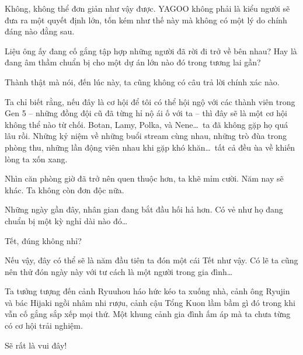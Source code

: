 \documentclass[../main.tex]{subfiles}
\begin{document}
Không, không thể đơn giản như vậy được. YAGOO không phải là kiểu người sẽ đưa ra một quyết định lớn, tốn kém như thế này mà không có một lý do chính đáng nào đằng sau.

Liệu ông ấy đang cố gắng tập hợp những người đã rời đi trở về bên nhau?
Hay là đang âm thầm chuẩn bị cho một dự án lớn nào đó trong tương lai gần?

Thành thật mà nói, đến lúc này, ta cũng không có câu trả lời chính xác nào.

Ta chỉ biết rằng, nếu đây là cơ hội để tôi có thể hội ngộ với các thành viên trong Gen 5 – những đồng đội cũ đã từng hỉ nộ ái ố với ta – thì đây sẽ là một cơ hội không thể nào từ chối. Botan, Lamy, Polka, và Nene\dots\ ta đã không gặp họ quá lâu rồi. Những kỷ niệm về những buổi stream cùng nhau, những trò đùa trong phòng thu, những lần động viên nhau khi gặp khó khăn\dots\ tất cả đều ùa về khiến lòng ta xốn xang.

Nhìn căn phòng giờ đã trở nên quen thuộc hơn, ta khẽ mỉm cười. Năm nay sẽ khác. Ta không còn đơn độc nữa.

Những ngày gần đây, nhân gian đang bắt đầu hối hả hơn. Có vẻ như họ đang chuẩn bị một kỳ nghỉ dài nào đó\dots

Tết, đúng không nhỉ?

Nếu vậy, đây có thể sẽ là năm đầu tiên ta đón một cái Tết như vậy. Có lẽ ta cũng nên thử đón ngày này với tư cách là một người trong gia đình\dots

Ta tưởng tượng đến cảnh Ryuuhou háo hức kéo ta xuống nhà, cảnh ông Ryujin và bác Hijaki ngồi nhâm nhi rượu, cảnh cậu Tổng Kuon lầm bầm gì đó trong khi vẫn cố gắng sắp xếp mọi thứ. Một khung cảnh gia đình ấm áp mà ta chưa từng có cơ hội trải nghiệm.

Sẽ rất là vui đây!
\end{document}

